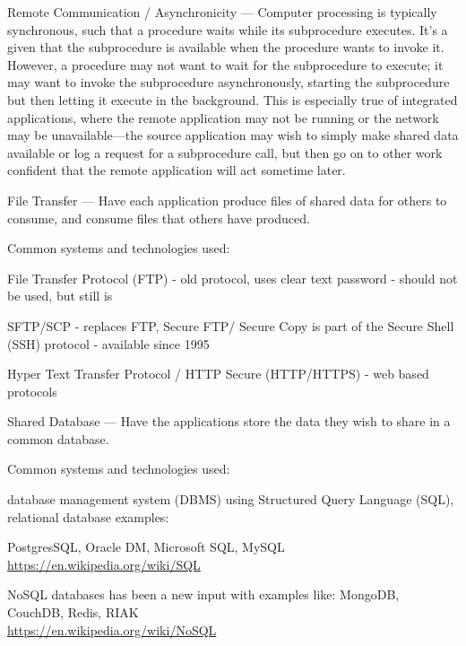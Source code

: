 \documentclass[Screen16to9,17pt]{foils}
\begin{document}
Remote Communication / Asynchronicity — Computer processing is typically synchronous, such that a procedure waits while its subprocedure executes. It’s a given that the subprocedure is available when the procedure wants to invoke it. However, a procedure may not want to wait for the subprocedure to execute; it may want to invoke the subprocedure asynchronously, starting the subprocedure but then letting it execute in the background. This is especially true of integrated applications, where the remote application may not be running or the network may be unavailable—the source application may wish to simply make shared data available or log a request for a subprocedure call, but then go on to other work confident that the remote application will act sometime later.



File Transfer — Have each application produce files of shared data for others to consume, and consume files that others have produced.

Common systems and technologies used:
\begin{list2}
\item File Transfer Protocol (FTP) - old protocol, uses clear text password - should not be used, but still is
\item SFTP/SCP - replaces FTP, Secure FTP/ Secure Copy is part of the Secure Shell (SSH) protocol - available since 1995
\item Hyper Text Transfer Protocol / HTTP Secure (HTTP/HTTPS) - web based protocols
\end{list2}



Shared Database — Have the applications store the data they wish to share in a common database.

Common systems and technologies used:
\begin{list2}
\item database management system (DBMS) using Structured Query Language (SQL), relational database examples:\\
\item PostgresSQL, Oracle DM, Microsoft SQL, MySQL
\url{https://en.wikipedia.org/wiki/SQL}
\item NoSQL databases has been a new input with examples like:
MongoDB, CouchDB, Redis, RIAK\\
\url{https://en.wikipedia.org/wiki/NoSQL}
\end{list2}
\end{document}
